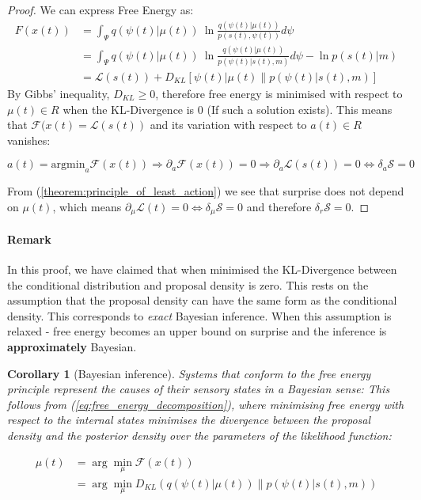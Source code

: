 \documentclass{article}
\newcommand{\refp}[1]{(\ref{#1})}
\newtheorem{corollary}{Corollary}
\begin{document}
\begin{proof}
	We can express Free Energy as:
	\begin{equation}\label{eq:free_energy_decomposition}
	\begin{aligned}
		F(x(t)) &= \int_\Psi q(\psi(t) | \mu(t))\ \ln\frac{q(\psi(t) | \mu(t))}{p(s(t), \psi(t))} d\psi \\
		&= \int_\Psi q(\psi(t) | \mu(t))\ \ln\frac{q(\psi(t) | \mu(t))}{p(\psi(t) | s(t), m)} d\psi - \ln p(s(t) | m) \\
		&= \mathcal{L}(s(t)) + D_{KL}\left[ \psi(t) | \mu(t) \| p(\psi(t) | s(t), m) \right]
	\end{aligned}
	\end{equation}
	By Gibbs' inequality, $D_{KL} \geq 0$, therefore free energy is minimised with respect to $\mu(t) \in R$ when the KL-Divergence is 0 (If such a solution exists). This means that $\mathcal{F}(x(t) = \mathcal{L}(s(t))$ and its variation with respect to $a(t) \in R$ vanishes:
	
	$$
	a(t) = \text{argmin}_a\mathcal{F}(x(t)) \Rightarrow \partial_a \mathcal{F}(x(t)) = 0 \Rightarrow \partial_a \mathcal{L}(s(t)) = 0 \Leftrightarrow \delta_a \mathcal{S} = 0
	$$
	
	From \refp{theorem:principle_of_least_action} we see that surprise does not depend on $\mu(t)$, which means $\partial_\mu \mathcal{L}(t) = 0 \Leftrightarrow \delta_\mu \mathcal{S} = 0$ and therefore $\delta_r \mathcal{S} = 0$.
\end{proof}

\paragraph{Remark} In this proof, we have claimed that when minimised the KL-Divergence between the conditional distribution and proposal density is zero. This rests on the assumption that the proposal density can have the same form as the conditional density. This corresponds to \textit{exact} Bayesian inference. When this assumption is relaxed - free energy becomes an upper bound on surprise and the inference is \textbf{approximately} Bayesian. 

\begin{corollary}[Bayesian inference]\label{cor:bayesian_inference}
	Systems that conform to the free energy principle represent the causes of their sensory states in a Bayesian sense: This follows from \refp{eq:free_energy_decomposition}, where minimising free energy with respect to the internal states minimises the divergence between the proposal density and the posterior density over the parameters of the likelihood function:
	
	\begin{align*}
		\mu(t) & =\arg \min _\mu \mathcal{F}(x(t)) \\
		& =\arg \min _\mu D_{K L}(q(\psi(t) | \mu(t)) \| p(\psi(t) | s(t), m))
	\end{align*}
\end{corollary}
\end{document}
